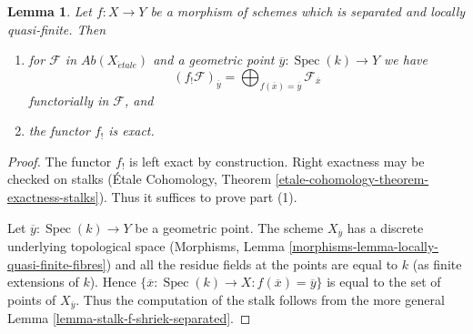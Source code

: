 \documentclass{stacks-project}
\theoremstyle{plain}
\newtheorem{lemma}[subsection]{Lemma}
\theoremstyle{definition}
\theoremstyle{remark}
\numberwithin{equation}{subsection}
\def\Spec{\mathop{\mathrm{Spec}}}
\def\etale{{\acute{e}tale}}
\begin{document}
\begin{lemma}
\label{lemma-lqf-f-shriek-separated-colimits}
Let $f : X \to Y$ be a morphism of schemes which is separated and
locally quasi-finite. Then
\begin{enumerate}
\item for $\mathcal{F}$ in $\textit{Ab}(X_\etale)$ and a geometric
point $\overline{y} : \Spec(k) \to Y$ we have
$$
(f_!\mathcal{F})_{\overline{y}} =
\bigoplus\nolimits_{f(\overline{x}) = \overline{y}} \mathcal{F}_{\overline{x}}
$$
functorially in $\mathcal{F}$, and
\item the functor $f_!$ is exact.
\end{enumerate}
\end{lemma}

\begin{proof}
The functor $f_!$ is left exact by construction. Right exactness may
be checked on stalks
(\'Etale Cohomology, Theorem \ref{etale-cohomology-theorem-exactness-stalks}).
Thus it suffices to prove part (1).

\medskip\noindent
Let $\overline{y} : \Spec(k) \to Y$ be a geometric point.
The scheme $X_{\overline{y}}$ has a discrete underlying
topological space
(Morphisms, Lemma \ref{morphisms-lemma-locally-quasi-finite-fibres})
and all the residue fields at the points are equal to $k$
(as finite extensions of $k$). Hence
$\{\overline{x} : \Spec(k) \to X : f(\overline{x}) = \overline{y}\}$
is equal to the set of points of $X_{\overline{y}}$.
Thus the computation of the stalk follows from the more general
Lemma \ref{lemma-stalk-f-shriek-separated}.
\end{proof}
\end{document}
